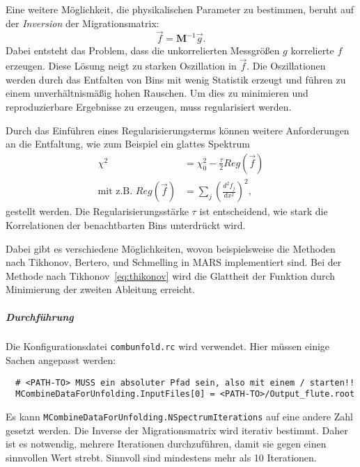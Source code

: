 Eine weitere Möglichkeit, die physikalischen Parameter zu bestimmen,
beruht auf der \textit{Inversion} der Migrationsmatrix:
\begin{equation}
    \vec{f} = \mathbf{M}^{-1} \vec{g}.
\end{equation}
Dabei entsteht das Problem, dass die unkorrelierten Messgrößen $g$
korrelierte $f$ erzeugen.
Diese
Lösung
neigt
zu starken Oszillation in $\vec{f}$.
Die Oszillationen werden durch das Entfalten von Bins mit wenig Statistik
erzeugt und führen
zu einem unverhältnismäßig hohen Rauschen.
Um dies zu minimieren und reproduzierbare Ergebnisse zu erzeugen,
muss regularisiert werden.


Durch das Einführen eines Regularisierungsterms können weitere Anforderungen an die
Entfaltung, wie zum Beispiel ein glattes Spektrum
\begin{align}
    \chi^2 &= \chi^2_0 - \frac{\tau}{2} Reg(\vec{f}) \\
    \text{mit z.B. } Reg(\vec{f}) &= \sum_j {\left( \frac{d^2 f_j}{dx^2}
    \right)}^2,
    \label{eq:thikonov}
\end{align}
gestellt werden.
Die Regularisierungsstärke $\tau$ ist entscheidend, wie stark die Korrelationen
der benachtbarten Bins unterdrückt wird. 

Dabei gibt es verschiedene Möglichkeiten,
wovon beispielsweise die Methoden nach
Tikhonov, Bertero, und Schmelling
in MARS implementiert sind.
Bei der Methode nach Tikhonov~\eqref{eq:thikonov} wird die Glattheit der
Funktion durch Minimierung der zweiten Ableitung erreicht.

\subparagraph{Durchführung}%

Die Konfigurationsdatei \texttt{combunfold.rc} wird verwendet.
Hier müssen einige Sachen angepasst werden:
\begin{lstlisting}
  # <PATH-TO> MUSS ein absoluter Pfad sein, also mit einem / starten!!
  MCombineDataForUnfolding.InputFiles[0] = <PATH-TO>/Output_flute.root
\end{lstlisting}
Es kann
\texttt{MCombineDataForUnfolding.NSpectrumIterations}
auf eine andere Zahl gesetzt werden.
Die Inverse der Migrationsmatrix wird iterativ bestimmt.
Daher ist es notwendig, mehrere
Iterationen durchzuführen, damit sie gegen einen sinnvollen Wert strebt.
Sinnvoll sind mindestens mehr als 10 Iterationen.


